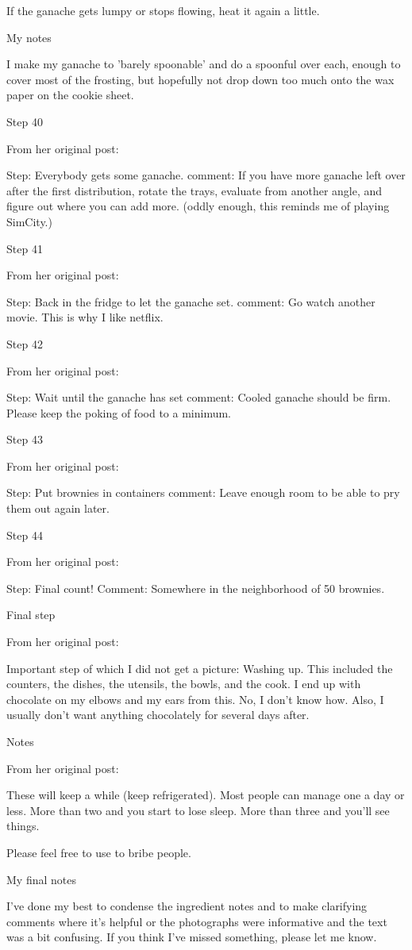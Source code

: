 If the ganache gets lumpy or stops flowing, heat it again a little.

My notes

I make my ganache to 'barely spoonable' and do a spoonful over each, enough to cover most of the frosting, but hopefully not drop down too much onto the wax paper on the cookie sheet.

Step 40

From her original post:

Step: Everybody gets some ganache.
comment: If you have more ganache left over after the first distribution, rotate the trays, evaluate from another angle, and figure out where you can add more.
(oddly enough, this reminds me of playing SimCity.)

Step 41

From her original post:

Step: Back in the fridge to let the ganache set.
comment: Go watch another movie. This is why I like netflix.

Step 42

From her original post:

Step: Wait until the ganache has set
comment: Cooled ganache should be firm. Please keep the poking of food to a minimum.

Step 43

From her original post:

Step: Put brownies in containers
comment: Leave enough room to be able to pry them out again later.

Step 44

From her original post:

Step: Final count!
Comment: Somewhere in the neighborhood of 50 brownies.

Final step

From her original post:

Important step of which I did not get a picture: Washing up. This included the counters, the dishes, the utensils, the bowls, and the cook. I end up with chocolate on my elbows and my ears from this. No, I don't know how. Also, I usually don't want anything chocolately for several days after.

Notes

From her original post:

These will keep a while (keep refrigerated). Most people can manage one a day or less. More than two and you start to lose sleep. More than three and you'll see things.

Please feel free to use to bribe people.

My final notes

I've done my best to condense the ingredient notes and to make clarifying comments where it's helpful or the photographs were informative and the text was a bit confusing. If you think I've missed something, please let me know.
